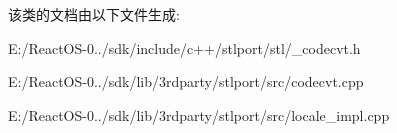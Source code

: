 该类的文档由以下文件生成\+:\begin{DoxyCompactItemize}
\item 
E\+:/\+React\+O\+S-\/0../sdk/include/c++/stlport/stl/\+\_\+codecvt.\+h\item 
E\+:/\+React\+O\+S-\/0../sdk/lib/3rdparty/stlport/src/codecvt.\+cpp\item 
E\+:/\+React\+O\+S-\/0../sdk/lib/3rdparty/stlport/src/locale\+\_\+impl.\+cpp\end{DoxyCompactItemize}
